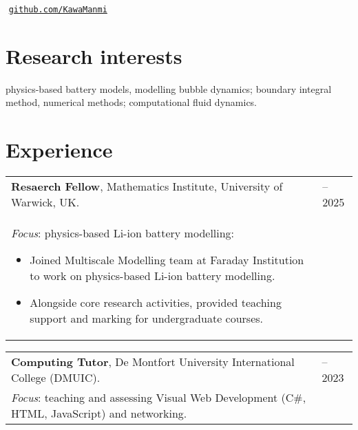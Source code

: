 \documentclass[line]{res}
\newenvironment{p1}
{\begin{adjustwidth}{-30pt}{0pt}
\vspace{8pt}}
{\end{adjustwidth}}
\newenvironment{p11}
{\begin{adjustwidth}{-25pt}{0pt}
\vspace{8pt}}
{\end{adjustwidth}}
\begin{document}



\begin{resume}
\section{}
\vspace{-15pt}
\\
\hspace*{0pt}\hfill\,\,\href{https://github.com/kawaMANMI}{\texttt{github.com/KawaManmi}}\\
\vspace{-25pt}
\noindent

\section{Research interests}
\begin{p11}
physics-based battery models, modelling bubble dynamics; boundary integral method, numerical methods; computational fluid dynamics.
\end{p11}


\section{Experience}

\begin{p1}
\begin{tabular}{p{} >{\raggedleft\arraybackslash}p{}}
	\textbf{Resaerch Fellow}, Mathematics Institute, University of Warwick, UK. & 2023--2025\\
	\textit{Focus}: physics-based Li-ion battery modelling:
	\begin{itemize}
		\item Joined Multiscale Modelling team at Faraday Institution to work on physics-based Li-ion battery modelling.
		\item Alongside core research activities, provided teaching support and marking for undergraduate courses.
	\end{itemize}
\end{tabular}


\begin{tabular}{p{} >{\raggedleft\arraybackslash}p{}}
	\textbf{Computing Tutor}, De Montfort University International College (DMUIC). & 2022--2023\\
	\textit{Focus}: teaching and assessing Visual Web Development (C\#, HTML, JavaScript) and  networking.
\end{tabular}


\end{p1}
\end{resume}
\end{document}
